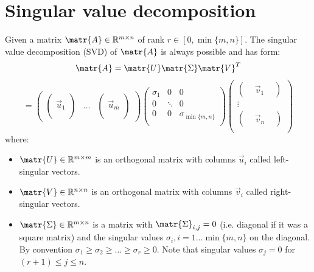 \section{Singular value decomposition}
Given a matrix $\matr{A} \in \mathbb{R}^{m \times n}$ of rank $r \in [0, \min\{m, n\}]$.
The singular value decomposition (SVD) of $\matr{A}$ is always possible and has form:
\[
    \matr{A} = \matr{U}\matr{\Sigma}\matr{V}^T
\]
\[
    =
    \begin{pmatrix}
        \begin{pmatrix} \\ \vec{u}_1 \\ \\ \end{pmatrix}    &
        \dots                                               &
        \begin{pmatrix} \\ \vec{u}_m \\ \\ \end{pmatrix} 
    \end{pmatrix}
    \begin{pmatrix}
        \sigma_1    & 0         & 0                 \\
        0           & \ddots    & 0                 \\
        0           & 0    & \sigma_{\min\{m, n\}}  \\
    \end{pmatrix}
    \begin{pmatrix}
        \begin{pmatrix} & \vec{v}_1 & \end{pmatrix} \\
        \vdots                                      \\
        \begin{pmatrix} & \vec{v}_n & \end{pmatrix} \\
    \end{pmatrix}
\]
where:
\begin{itemize}
    \item 
        $\matr{U} \in \mathbb{R}^{m \times m}$ is an orthogonal matrix with columns $\vec{u}_i$ called left-singular vectors.
    
    \item 
        $\matr{V} \in \mathbb{R}^{n \times n}$ is an orthogonal matrix with columns $\vec{v}_i$ called right-singular vectors.
    
    \item 
        $\matr{\Sigma} \in \mathbb{R}^{m \times n}$ is a matrix with $\matr{\Sigma}_{i,j} = 0$ (i.e. diagonal if it was a square matrix) and
        the singular values $\sigma_i, i = 1 \dots \min\{m, n\}$ on the diagonal.
        By convention $\sigma_1 \geq \sigma_2 \geq \dots \geq \sigma_r \geq 0$.
        Note that singular values $\sigma_j = 0$ for $(r + 1) \leq j \leq n$.
\end{itemize}

